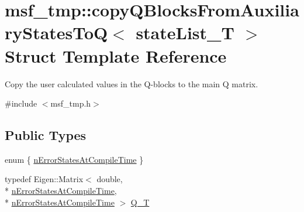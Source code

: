 \hypertarget{structmsf__tmp_1_1copyQBlocksFromAuxiliaryStatesToQ}{\section{msf\-\_\-tmp\-:\-:copy\-Q\-Blocks\-From\-Auxiliary\-States\-To\-Q$<$ state\-List\-\_\-\-T $>$ Struct Template Reference}
\label{structmsf__tmp_1_1copyQBlocksFromAuxiliaryStatesToQ}
}


Copy the user calculated values in the Q-\/blocks to the main Q matrix.  




{\ttfamily \#include $<$msf\-\_\-tmp.\-h$>$}

\subsection*{Public Types}
\begin{DoxyCompactItemize}
\item 
enum \{ \hyperlink{structmsf__tmp_1_1copyQBlocksFromAuxiliaryStatesToQ_a4e1fad7e266ab146be8673fc5f76877ba3cc565a15fa678e53d797e0f7192f720}{n\-Error\-States\-At\-Compile\-Time}
 \}
\item 
typedef Eigen\-::\-Matrix$<$ double, \\*
\hyperlink{structmsf__tmp_1_1copyQBlocksFromAuxiliaryStatesToQ_a4e1fad7e266ab146be8673fc5f76877ba3cc565a15fa678e53d797e0f7192f720}{n\-Error\-States\-At\-Compile\-Time}, \\*
\hyperlink{structmsf__tmp_1_1copyQBlocksFromAuxiliaryStatesToQ_a4e1fad7e266ab146be8673fc5f76877ba3cc565a15fa678e53d797e0f7192f720}{n\-Error\-States\-At\-Compile\-Time} $>$ \hyperlink{structmsf__tmp_1_1copyQBlocksFromAuxiliaryStatesToQ_ae129639a59b673f01724af984fde8c2c}{Q\-\_\-\-T}
\end{DoxyCompactItemize}
